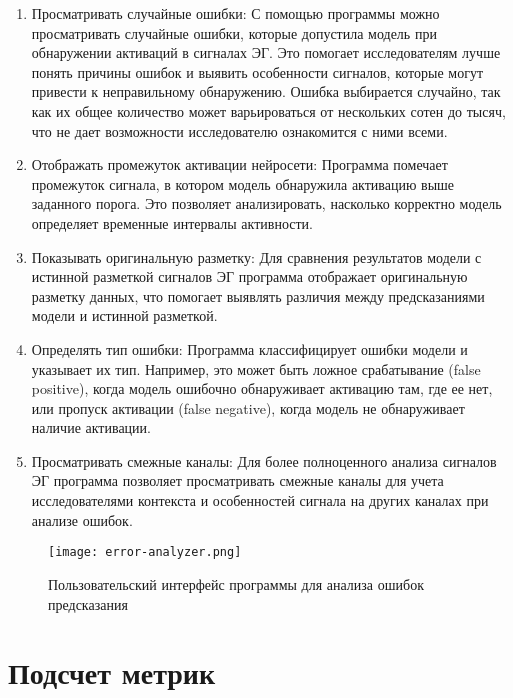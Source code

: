 \begin{enumerate}

	\item Просматривать случайные ошибки: С помощью программы можно
	просматривать случайные ошибки, которые допустила модель при обнаружении
	активаций в сигналах ЭГ. Это помогает исследователям лучше понять причины
	ошибок и выявить особенности сигналов, которые могут привести к
	неправильному обнаружению. Ошибка выбирается случайно, так как их общее
	количество может варьироваться от нескольких сотен до тысяч, что не дает
	возможности исследователю ознакомится с ними всеми.

	\item Отображать промежуток активации нейросети: Программа помечает
	промежуток сигнала, в котором модель обнаружила активацию выше заданного
	порога. Это позволяет анализировать, насколько корректно модель определяет
	временные интервалы активности.

	\item Показывать оригинальную разметку: Для сравнения результатов модели с
	истинной разметкой сигналов ЭГ программа отображает оригинальную разметку
	данных, что помогает выявлять различия между предсказаниями модели и
	истинной разметкой.

	\item Определять тип ошибки: Программа классифицирует ошибки модели и
	указывает их тип. Например, это может быть ложное срабатывание (false
	positive), когда модель ошибочно обнаруживает активацию там, где ее нет,
	или пропуск активации (false negative), когда модель не обнаруживает
	наличие активации.

	\item Просматривать смежные каналы: Для более полноценного анализа сигналов
	ЭГ программа позволяет просматривать смежные каналы для учета
	исследователями контекста и особенностей сигнала на других каналах при
	анализе ошибок.

\end{enumerate}


\begin{figure}[!htb]
	\centering
	\label{fig:error-analyser}
	\caption{Пользовательский интерфейс программы для анализа ошибок предсказания}
	\texttt{[image: error-analyzer.png]}
\end{figure}

\section{Подсчет метрик}

